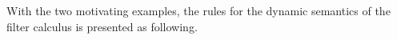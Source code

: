 
With the two motivating examples, the rules for the dynamic semantics
of the filter calculus is presented as following.

